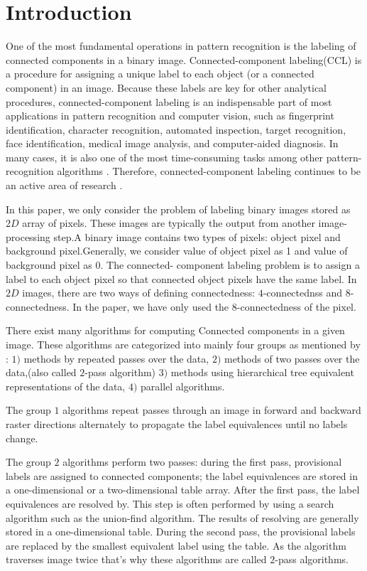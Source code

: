 \section{Introduction}

One of the most fundamental operations in pattern recognition is the labeling of connected components in a binary image.
Connected-component labeling(CCL) is a procedure for assigning a unique label to each object (or a connected component) in 
an image. Because these labels are key for other analytical procedures, connected-component labeling is an 
indispensable part of most applications in pattern recognition and computer vision, such as fingerprint identification,
character recognition, automated inspection, target recognition, face identification, medical image analysis, and 
computer-aided diagnosis. In many cases, it is also one of the most time-consuming tasks among other 
pattern-recognition algorithms \cite{Alnuweiri1992_Parallel}. Therefore, connected-component labeling continues 
to be an active area of research \cite{Gonzales_Digital,Agarwal2006_Efficient,Chang2004_Linear,Hayashi2001_Fast,
Hu2005_Fast,Knop1998_Parallel,Moga1997_Parallel,Wang2003_Parallel}.

In this paper, we only consider the problem of labeling binary images stored as $2D$ array of pixels. These images are 
typically the output from another image-processing step.A binary image contains two types of pixels: object pixel and 
background pixel.Generally, we consider value of object pixel as 1 and value of background pixel as 0. The connected-
component labeling problem is to assign a label to each object pixel so that connected object pixels have the same label.
In $2D$ images, there are two ways of defining connectedness: $4$-connectednss and $8$-connectedness. In the paper, we have 
only used the $8$-connectedness of the pixel.

There exist many algorithms for computing Connected components in a given image. These algorithms are categorized into
mainly four groups as mentioned by \cite{Suzuki2003_Linear}: $1)$ methods by repeated passes over the data, $2)$ methods 
of two passes over the data,(also called $2$-pass algorithm) $3)$ methods using hierarchical tree equivalent representations 
of the data, $4)$ parallel algorithms.

The group $1$ algorithms repeat passes through an image in forward and backward raster directions alternately to propagate 
the label equivalences until no labels change.

The group $2$ algorithms perform two passes: during the first pass, provisional labels are assigned to connected components;
the label equivalences are stored in a one-dimensional or a two-dimensional table array. After the first pass, the label 
equivalences are resolved by. This step is often performed by using a search algorithm such as the union-find algorithm.
The results of resolving are generally stored in a one-dimensional table. During the second pass, the provisional labels are 
replaced by the smallest equivalent label using the table. As the algorithm traverses image twice that's why these algorithms 
are called $2$-pass algorithms.

